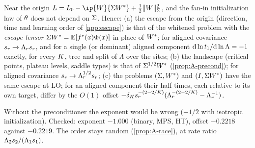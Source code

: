 \begin{proposition}\label{prop:A-escape-cov}
  \derived{} 
  Near the origin $\Loss=\Loss_0-\ip{\W}{\Sig\Wt}+\frac12\normS{\W}^2$, and the fan-in initialization law of $\theta$
  does not depend on $\Sigma$. Hence: (a) the escape from the origin (direction, time and learning order of
  \cref{app:escape}) is that of the whitened problem with the \emph{escape tensor}
  $\Sigma W^{*}=\mathbb{E}[f^*(x)\Phi(x)]$ in place of $W^{*}$; for aligned covariance $s_{r}\to\Lambda_rs_{r}$, and for a single
  (or dominant) aligned component $\mathrm{d}\ln t_{1}/\mathrm{d}\ln\Lambda=-1$ exactly, for every $K$, tree and split of
  $\Lambda$ over the sites; (b) the landscape (critical points, plateau levels, saddle types) is that of
  $\Sigma^{1/2}W^{*}$ (\cref{prop:A-precond}); for aligned covariance $s_{r}\to\Lambda_r^{1/2}s_{r}$; (c) the problems
  $(\Sigma,W^{*})$ and $(I,\Sigma W^{*})$ have the same escape at LO; for an aligned component their half-times, each
  relative to its own target, differ by the $O(1)$ offset $-\delta_Ks_{r}^{-(2-2/K)}(\Lambda_r^{-(2-2/K)}-\Lambda_r^{-1})$.
\end{proposition}
Without the preconditioner the exponent would be wrong ($-1/2$ with isotropic initialization). Checked:
exponent $-1.000$ (binary, MPS, HT), offset $-0.2218$ against $-0.2219$. The order stays random
(\cref{prop:A-race}), at rate ratio $\Lambda_2s_{2}/(\Lambda_1s_{1})$.

